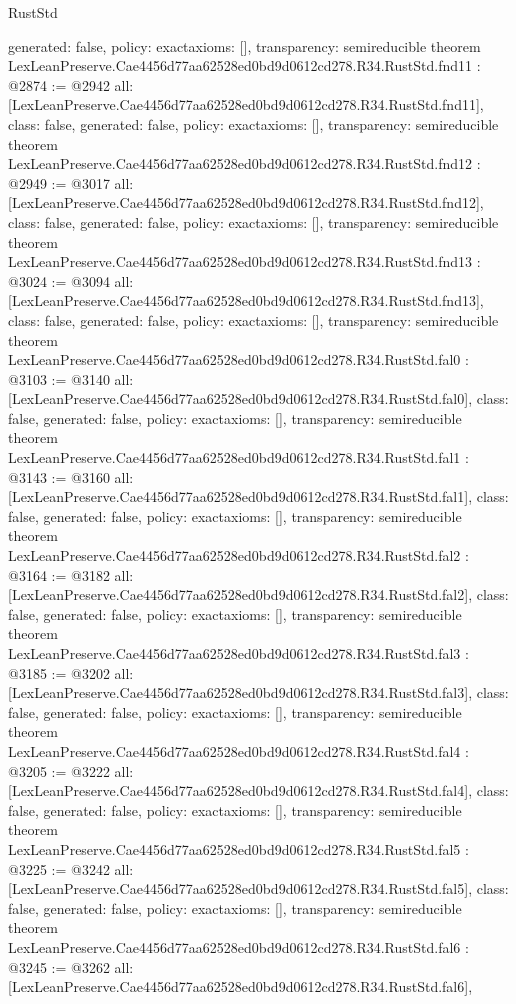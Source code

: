 \begin{lexlean}{RustStd}
\begin{coremodule}
{  generated: false,
  policy: exact{axioms: []},
  transparency: semireducible
}
theorem LexLeanPreserve.Cae4456d77aa62528ed0bd9d0612cd278.R34.RustStd.fnd11 : @2874 := @2942 {
  all: [LexLeanPreserve.Cae4456d77aa62528ed0bd9d0612cd278.R34.RustStd.fnd11],
  class: false,
  generated: false,
  policy: exact{axioms: []},
  transparency: semireducible
}
theorem LexLeanPreserve.Cae4456d77aa62528ed0bd9d0612cd278.R34.RustStd.fnd12 : @2949 := @3017 {
  all: [LexLeanPreserve.Cae4456d77aa62528ed0bd9d0612cd278.R34.RustStd.fnd12],
  class: false,
  generated: false,
  policy: exact{axioms: []},
  transparency: semireducible
}
theorem LexLeanPreserve.Cae4456d77aa62528ed0bd9d0612cd278.R34.RustStd.fnd13 : @3024 := @3094 {
  all: [LexLeanPreserve.Cae4456d77aa62528ed0bd9d0612cd278.R34.RustStd.fnd13],
  class: false,
  generated: false,
  policy: exact{axioms: []},
  transparency: semireducible
}
theorem LexLeanPreserve.Cae4456d77aa62528ed0bd9d0612cd278.R34.RustStd.fal0 : @3103 := @3140 {
  all: [LexLeanPreserve.Cae4456d77aa62528ed0bd9d0612cd278.R34.RustStd.fal0],
  class: false,
  generated: false,
  policy: exact{axioms: []},
  transparency: semireducible
}
theorem LexLeanPreserve.Cae4456d77aa62528ed0bd9d0612cd278.R34.RustStd.fal1 : @3143 := @3160 {
  all: [LexLeanPreserve.Cae4456d77aa62528ed0bd9d0612cd278.R34.RustStd.fal1],
  class: false,
  generated: false,
  policy: exact{axioms: []},
  transparency: semireducible
}
theorem LexLeanPreserve.Cae4456d77aa62528ed0bd9d0612cd278.R34.RustStd.fal2 : @3164 := @3182 {
  all: [LexLeanPreserve.Cae4456d77aa62528ed0bd9d0612cd278.R34.RustStd.fal2],
  class: false,
  generated: false,
  policy: exact{axioms: []},
  transparency: semireducible
}
theorem LexLeanPreserve.Cae4456d77aa62528ed0bd9d0612cd278.R34.RustStd.fal3 : @3185 := @3202 {
  all: [LexLeanPreserve.Cae4456d77aa62528ed0bd9d0612cd278.R34.RustStd.fal3],
  class: false,
  generated: false,
  policy: exact{axioms: []},
  transparency: semireducible
}
theorem LexLeanPreserve.Cae4456d77aa62528ed0bd9d0612cd278.R34.RustStd.fal4 : @3205 := @3222 {
  all: [LexLeanPreserve.Cae4456d77aa62528ed0bd9d0612cd278.R34.RustStd.fal4],
  class: false,
  generated: false,
  policy: exact{axioms: []},
  transparency: semireducible
}
theorem LexLeanPreserve.Cae4456d77aa62528ed0bd9d0612cd278.R34.RustStd.fal5 : @3225 := @3242 {
  all: [LexLeanPreserve.Cae4456d77aa62528ed0bd9d0612cd278.R34.RustStd.fal5],
  class: false,
  generated: false,
  policy: exact{axioms: []},
  transparency: semireducible
}
theorem LexLeanPreserve.Cae4456d77aa62528ed0bd9d0612cd278.R34.RustStd.fal6 : @3245 := @3262 {
  all: [LexLeanPreserve.Cae4456d77aa62528ed0bd9d0612cd278.R34.RustStd.fal6],
}
\end{coremodule}
\end{lexlean}
